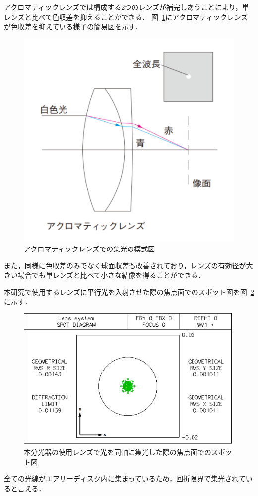 アクロマティックレンズでは構成する2つのレンズが補完しあうことにより，単レンズと比べて色収差を抑えることができる．
図\ \ref{fig:achromaticlense}にアクロマティックレンズが色収差を抑えている様子の簡易図を示す．
\begin{figure}[htbp]
    \centering
    \includegraphics[scale=0.6]{figure/achromaticlense.pdf}
    \caption{アクロマティックレンズでの集光の模式図\cite{achromatic_lens}}
    \label{fig:achromaticlense}
\end{figure}
また，同様に色収差のみでなく球面収差も改善されており，レンズの有効径が大きい場合でも単レンズと比べて小さな結像を得ることができる\cite{achromatic_lens}．


本研究で使用するレンズに平行光を入射させた際の焦点面でのスポット図を図\ \ref{fig:lens_spot}に示す．
\begin{figure}[htbp]
    \centering
    \includegraphics[scale=0.6]{figure/lens_spot.pdf}
    \caption{本分光器の使用レンズで光を同軸に集光した際の焦点面でのスポット図}
    \label{fig:lens_spot}
\end{figure}
全ての光線がエアリーディスク内に集まっているため，回折限界で集光されていると言える．

